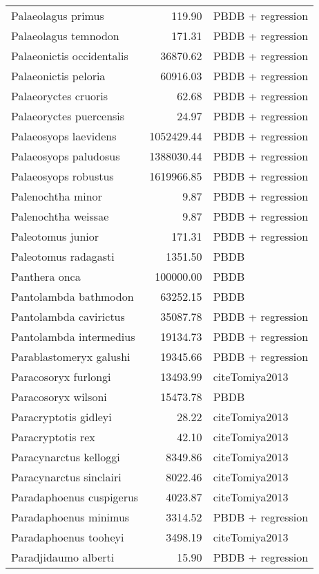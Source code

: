 \begin{table}[ht]
\begin{tabular}{lrl}
  Palaeolagus primus & 119.90 & PBDB + regression \\ 
  Palaeolagus temnodon & 171.31 & PBDB + regression \\ 
  Palaeonictis occidentalis & 36870.62 & PBDB + regression \\ 
  Palaeonictis peloria & 60916.03 & PBDB + regression \\ 
  Palaeoryctes cruoris & 62.68 & PBDB + regression \\ 
  Palaeoryctes puercensis & 24.97 & PBDB + regression \\ 
  Palaeosyops laevidens & 1052429.44 & PBDB + regression \\ 
  Palaeosyops paludosus & 1388030.44 & PBDB + regression \\ 
  Palaeosyops robustus & 1619966.85 & PBDB + regression \\ 
  Palenochtha minor & 9.87 & PBDB + regression \\ 
  Palenochtha weissae & 9.87 & PBDB + regression \\ 
  Paleotomus junior & 171.31 & PBDB + regression \\ 
  Paleotomus radagasti & 1351.50 & PBDB \\ 
  Panthera onca & 100000.00 & PBDB \\ 
  Pantolambda bathmodon & 63252.15 & PBDB \\ 
  Pantolambda cavirictus & 35087.78 & PBDB + regression \\ 
  Pantolambda intermedius & 19134.73 & PBDB + regression \\ 
  Parablastomeryx galushi & 19345.66 & PBDB + regression \\ 
  Paracosoryx furlongi & 13493.99 & cite{Tomiya2013} \\ 
  Paracosoryx wilsoni & 15473.78 & PBDB \\ 
  Paracryptotis gidleyi & 28.22 & cite{Tomiya2013} \\ 
  Paracryptotis rex & 42.10 & cite{Tomiya2013} \\ 
  Paracynarctus kelloggi & 8349.86 & cite{Tomiya2013} \\ 
  Paracynarctus sinclairi & 8022.46 & cite{Tomiya2013} \\ 
  Paradaphoenus cuspigerus & 4023.87 & cite{Tomiya2013} \\ 
  Paradaphoenus minimus & 3314.52 & PBDB + regression \\ 
  Paradaphoenus tooheyi & 3498.19 & cite{Tomiya2013} \\ 
  Paradjidaumo alberti & 15.90 & PBDB + regression \\ 

\end{tabular}
\end{table}
